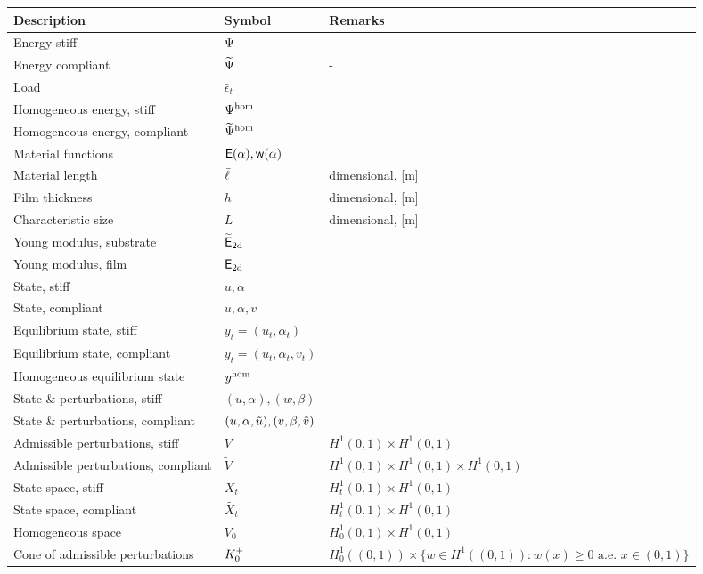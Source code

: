\documentclass[10pt]{article}
\begin{document}
\begin{table}[h!]
  \centering
  \begin{tabular}{  m{5.5cm}  m{3cm}  m{6cm}  }
    \hline
    \textbf{Description} & \textbf{Symbol} & \textbf{Remarks} \\
    \hline
    Energy stiff     & $\Psi$ & - \\
    Energy compliant & $\widetilde\Psi$ & - \\
    Load & $\bar\epsilon_t$ & \\
    Homogeneous energy, stiff   & $\Psi^\text{hom}$ & \\
    Homogeneous energy, compliant   & $\widetilde\Psi^\text{hom}$ & \\
    Material functions &  $\mathsf E(\alpha), \mathsf{w}(\alpha)$ & \\
    Material length & $\bar{\ell}$ & dimensional, [m]\\
    Film thickness & $h$ & dimensional, [m]\\
    Characteristic size & $L$ & dimensional, [m]\\
    Young modulus, substrate & ${\mathsf{\widetilde E_{\text{2d}}}}$ & \\
    Young modulus, film & $\mathsf{E_{\text{2d}}}$ & \\
    State, stiff& $u, \alpha$ & \\
    State, compliant& $u, \alpha, v$ & \\
    Equilibrium state, stiff& $y_t=(u_t, \alpha_t)$ & \\
    Equilibrium state, compliant & $y_t=(u_t, \alpha_t, v_t)$ & \\
    Homogeneous equilibrium state  & $y^{\text{hom}}$ & \\
    State \& perturbations, stiff & $(u,\alpha), (w, \beta)$ & \\
    State \& perturbations, compliant & $(u, \alpha, \tilde u), (v, \beta, \tilde v)$ & \\
    Admissible perturbations, stiff& $V$ & $H^1(0,1)\times  H^1(0,1)$\\
    Admissible perturbations, compliant& $\widetilde{V}$ & $H^1(0,1)\times  H^1(0,1)\times  H^1(0,1)$\\
    State space, stiff& $X_t$ & $H^1_t(0,1)\times  H^1(0,1)$\\
    State space, compliant& $\widetilde{X_t}$ & $H^1_t(0,1)\times  H^1(0,1)$\\
    Homogeneous space& $V_0$ & $H^1_0(0,1)\times  H^1(0,1)$\\
    Cone of admissible perturbations& $K^+_{0}$ & $H^1_0((0, 1))\times \{w \in H^1((0, 1)): w(x) \geq 0 \text{ a.e. }x\in (0, 1)\}$\\

\end{tabular}
\end{table}
\end{document}
